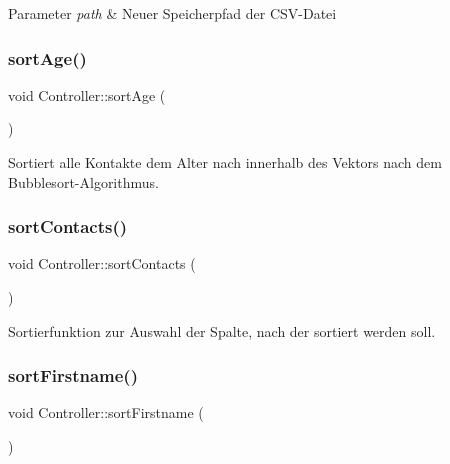 \begin{DoxyParams}{Parameter}
{\em path} & Neuer Speicherpfad der C\+S\+V-\/\+Datei\\
\hline
\end{DoxyParams}
\mbox{\label{classContactManager_1_1Controller_ad2255cf6b5cfe0391df4177ff46ad9e7}} 
\subsubsection{\texorpdfstring{sort\+Age()}{sortAge()}}
{\footnotesize\ttfamily void Controller\+::sort\+Age (\begin{DoxyParamCaption}{ }\end{DoxyParamCaption})}



Sortiert alle Kontakte dem Alter nach innerhalb des Vektors nach dem Bubblesort-\/\+Algorithmus.

\mbox{\label{classContactManager_1_1Controller_af56c72c2c38e48a493a164d7e992b964}} 
\subsubsection{\texorpdfstring{sort\+Contacts()}{sortContacts()}}
{\footnotesize\ttfamily void Controller\+::sort\+Contacts (\begin{DoxyParamCaption}{ }\end{DoxyParamCaption})}



Sortierfunktion zur Auswahl der Spalte, nach der sortiert werden soll.

\mbox{\label{classContactManager_1_1Controller_af659c3cc052470398bc90786606a4bb6}} 
\subsubsection{\texorpdfstring{sort\+Firstname()}{sortFirstname()}}
{\footnotesize\ttfamily void Controller\+::sort\+Firstname (\begin{DoxyParamCaption}{ }\end{DoxyParamCaption})}



